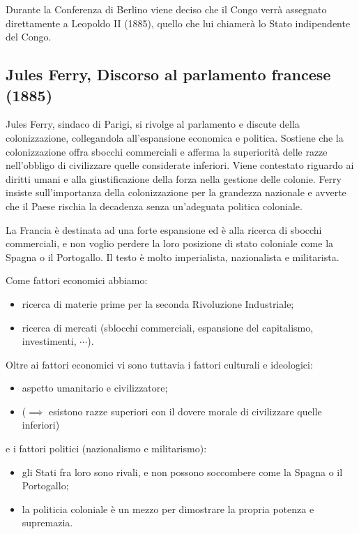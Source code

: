 \documentclass[a4paper]{article}
\begin{document}
Durante la Conferenza di Berlino viene deciso che il Congo verrà assegnato
direttamente a Leopoldo II (1885), quello che lui chiamerà lo Stato indipendente del Congo.


\pagebreak

\subsection{Jules Ferry, Discorso al parlamento francese (1885)}

Jules Ferry, sindaco di Parigi, si rivolge al parlamento e
discute della colonizzazione, collegandola all'espansione economica e politica.
Sostiene che la colonizzazione offra sbocchi commerciali e afferma la superiorità delle razze
nell'obbligo di civilizzare quelle considerate inferiori.
Viene contestato riguardo ai diritti umani e alla giustificazione della forza nella
gestione delle colonie.
Ferry insiste sull'importanza della colonizzazione per la grandezza nazionale e
avverte che il Paese rischia la decadenza senza un'adeguata politica coloniale.

La Francia è destinata ad una forte espansione ed è alla ricerca di sbocchi commerciali,
e non voglio perdere la loro posizione di stato coloniale come la Spagna o il Portogallo.
Il testo è molto imperialista, nazionalista e militarista.

Come fattori economici abbiamo:
\begin{itemize}
    \item ricerca di materie prime per la seconda Rivoluzione Industriale;
    \item ricerca di mercati (sblocchi commerciali, espansione del capitalismo, investimenti, \(\cdots\)).
\end{itemize}
Oltre ai fattori economici vi sono tuttavia i fattori culturali e ideologici:
\begin{itemize}
    \item aspetto umanitario e civilizzatore;
    \item (\(\implies\) esistono razze superiori con il dovere morale di civilizzare quelle inferiori)
\end{itemize}
e i fattori politici (nazionalismo e militarismo):
\begin{itemize}
    \item gli Stati fra loro sono rivali, e non possono soccombere come la Spagna o il Portogallo;
    \item la politicia coloniale è un mezzo per dimostrare la propria potenza e supremazia.
\end{itemize}
\end{document}
